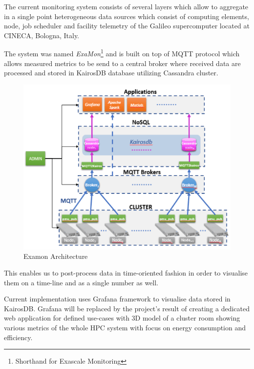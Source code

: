 \documentclass[a4paper, twoside]{article}
\newcommand{\highlight}[1]{\textcolor{prace-orange}{#1}}
\begin{document}
\begin{multicols}{3}

\lettrine[lines=4,nindent=0em]{\highlight{T}}{}he current monitoring system\cite{current} consists of several layers which allow to aggregate in a single point heterogeneous data sources which consist of computing elements, node, job scheduler and facility telemetry of the Galileo supercomputer located at CINECA, Bologna, Italy.

The system was named \textit{ExaMon}\footnote{Shorthand for Exascale Monitoring} and is built on top of MQTT protocol\cite{mqtt} which allows measured metrics to be send to a central broker where received data are processed and stored in KairosDB database utilizing Cassandra cluster.

\begin{figure}[H]
    \includegraphics[width=0.9\linewidth]{examon-architecture}
    \caption{Examon Architecture}
    \label{arch}
\end{figure}

This enables us to post-process data in time-oriented fashion in order to visualise them on a time-line and as a single number as well.

Current implementation uses Grafana framework to visualise data stored in KairosDB. Grafana will be replaced by the project's result of creating a dedicated web application for defined use-cases with 3D model of a cluster room showing various metrics of the whole HPC system with focus on energy consumption and efficiency.


\end{multicols}
\end{document}
